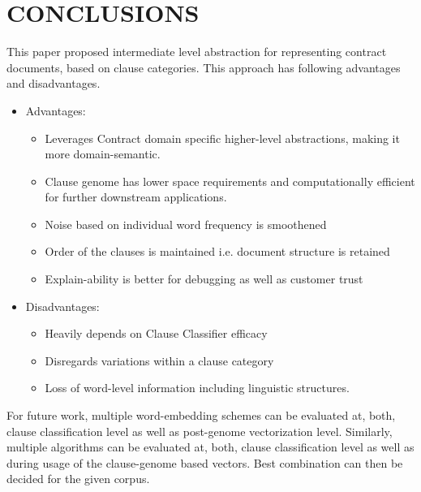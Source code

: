 \documentclass[journal]{journal}
\begin{document}


\section{CONCLUSIONS}

This paper proposed intermediate level abstraction for representing contract documents, based on clause categories. This approach has following advantages and disadvantages.

 \begin{itemize}
 \item Advantages:
  \begin{itemize}
\item Leverages Contract domain specific higher-level abstractions, making it more domain-semantic.
\item Clause genome has lower space requirements and computationally efficient for further downstream applications.
\item Noise based on individual word frequency is smoothened
\item Order of the clauses is maintained i.e. document structure is retained
\item Explain-ability is better for debugging as well as customer trust
\end{itemize}
\item Disadvantages:
 \begin{itemize}
\item Heavily depends on Clause Classifier efficacy
\item Disregards variations within a clause category
\item Loss of word-level information including linguistic structures.
\end{itemize}
\end{itemize}

For future work, multiple word-embedding schemes can be evaluated at, both, clause classification level as well as post-genome vectorization level. Similarly,  multiple algorithms can be evaluated at, both, clause classification level as well as during usage of the clause-genome based vectors. Best combination can then be decided for the given corpus.
%









\bigskip
\end{document}

